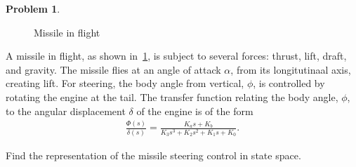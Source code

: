 \documentclass[10pt]{article}
\theoremstyle{definition}
\newtheorem{prob}{Problem}[section]
\begin{document}
\begin{prob}
    \begin{figure}[h]
        \centering
        \begin{scaletikzpicturetowidth}{1\textwidth}
    \end{scaletikzpicturetowidth}
    \caption{Missile in flight~\label{fig:missile}}
    \end{figure}
    A missile in flight, as shown in~\cref{fig:missile}, is subject to several forces: thrust, lift, draft, and gravity.
    The missile flies at an angle of attack \( \alpha \), from its longitutinaal axis, creating lift. 
    For steering, the body angle from vertical, \( \phi \), is controlled by rotating the engine at the tail. 
    The transfer function relating the body angle, \( \phi \), to the angular displacement \( \delta \) of the engine is of the form
    \begin{align*}
        \frac{\Phi(s)}{\delta(s)} = \frac{K_a s + K_b}{K_3 s^3 + K_2 s^2 + K_1 s + K_0}.  
    \end{align*}

    \noindent Find the representation of the missile steering control in state space.
\end{prob}
\end{document}
